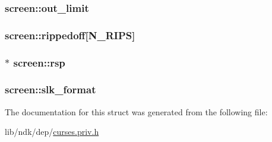 \hypertarget{structscreen_a44fccdfd249b6f4070dcb219906d3bb2}{
\subsubsection[{out\-\_\-limit}]{ screen\-::out\-\_\-limit}}\label{structscreen_a44fccdfd249b6f4070dcb219906d3bb2}
\hypertarget{structscreen_a068f6aaf125403e5d7fb8d3c8e833fc8}{
\subsubsection[{rippedoff}]{ screen\-::rippedoff\mbox{[}{\bf N\-\_\-\-R\-I\-P\-S}\mbox{]}}}\label{structscreen_a068f6aaf125403e5d7fb8d3c8e833fc8}
\hypertarget{structscreen_aeb609174f45117ebf0a23b17ae600001}{
\subsubsection[{rsp}]{$\ast$ screen\-::rsp}}\label{structscreen_aeb609174f45117ebf0a23b17ae600001}
\hypertarget{structscreen_a3c19043858791f82efc0911657eb28a3}{
\subsubsection[{slk\-\_\-format}]{ screen\-::slk\-\_\-format}}\label{structscreen_a3c19043858791f82efc0911657eb28a3}


The documentation for this struct was generated from the following file\-:\begin{DoxyCompactItemize}
\item 
lib/ndk/dep/\hyperlink{curses_8priv_8h}{curses.\-priv.\-h}\end{DoxyCompactItemize}
